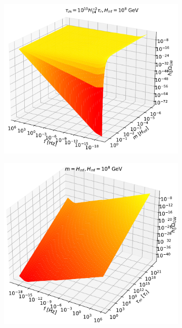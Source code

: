 \begin{figure}[ht!]
\begin{subfigure}{.5\textwidth}
  \centering
  \includegraphics[width=.82\linewidth]{fig/fig4a.pdf}  
  \label{fig:contour-a}
\end{subfigure}
\begin{subfigure}{.5\textwidth}
  \centering
  \includegraphics[width=.82\linewidth]{fig/fig4b.pdf}  
  \label{fig:contour-b}
\end{subfigure}
\begin{subfigure}{.5\textwidth}
  \centering

\end{subfigure}
\end{figure}
